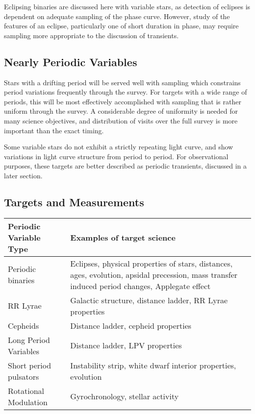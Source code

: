 Eclipsing binaries are discussed here with variable stars, as detection of eclipses is dependent on adequate sampling of the phase curve.  However, study of the  features of an eclipse, particularly one of short duration in phase, may require sampling more appropriate to the discussion of transients.

\subsection{Nearly Periodic Variables}

Stars with a drifting  period will be served well with sampling which constrains period variations frequently through the survey.  For targets with a wide range of periods, this will be most effectively accomplished with sampling that is rather uniform through the survey.  A considerable degree of uniformity is needed for many science objectives, and distribution of visits over the full survey is more important than the exact timing.

Some variable stars do not exhibit a strictly repeating light curve, and show variations in light curve structure from period to period.  For observational purposes, these targets are better described as periodic transients, discussed in a later section.



\subsection{Targets and Measurements}
\label{sec:keyword:targets}

\begin{center}
\begin{tabular}{| l | p{10cm} |}
\hline Periodic Variable Type & Examples of target science\\
\hline
Periodic binaries & Eclipses, physical properties of stars, distances, ages, evolution, apsidal precession, mass transfer induced period changes, Applegate effect\\
RR Lyrae & Galactic structure, distance ladder, RR Lyrae properties\\
Cepheids & Distance ladder, cepheid properties\\
Long Period Variables & Distance ladder, LPV properties\\
Short period pulsators & Instability strip, white dwarf interior properties, evolution\\
Rotational Modulation & Gyrochronology, stellar activity\\
 \hline \end{tabular}
 \end{center}

